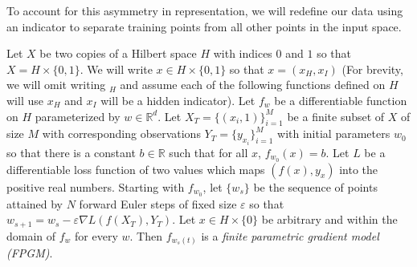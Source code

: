 To account for this asymmetry in representation, we will redefine our data using an indicator to separate training points from all other points in the input space.
\begin{definition}
\label{fpm}
Let $X$ be two copies of a Hilbert space $H$ with indices $0$ and $1$ so that $X = H \times \{0,1\}$. We will write $x \in H \times \{0,1\}$ so that $x = (x_H, x_I)$ (For brevity, we will omit writing $_H$ and assume each of the following functions defined on $H$ will use $x_H$ and $x_I$ will be a hidden indicator).
Let $ f_{w}$ be a differentiable function on $H$ parameterized by $w \in \mathbb{R}^d$. Let $X_T = \{(x_i, 1)\}_{i=1}^M$ be a finite subset of $X$ of size $M$ with corresponding observations $Y_T = \{y_{x_i}\}_{i=1}^M$ with initial parameters $w_0$ so that there is a constant $b \in \mathbb{R}$ such that for all $x$, $ f_{w_0}(x) = b$. Let $L$ be a differentiable loss function of two values which maps $(f(x), y_x)$ into the positive real numbers. Starting with $f_{w_0}$, let $\{w_s\}$ be the sequence of points attained by $N$ forward Euler steps of fixed size $\varepsilon$ so that $w_{s+1} = w_{s} - \varepsilon \nabla L(f(X_T), Y_T)$. Let $x \in H \times \{0\}$ be arbitrary and within the domain of $f_w$ for every $w$. Then $f_{w_s(t)}$ is a \emph{finite parametric gradient model (FPGM)}. 
\end{definition}

